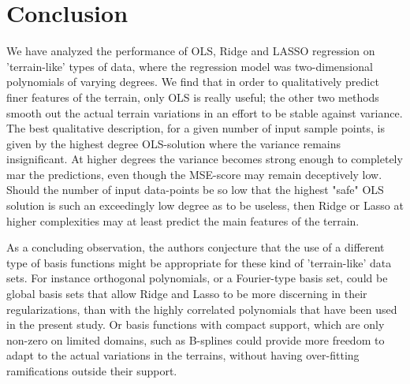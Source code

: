 \documentclass[reprint, english, nofootinbib]{revtex4-2}
\begin{document}

\section{Conclusion}


We have analyzed the performance of OLS, Ridge and LASSO regression on 'terrain-like' types of data, where the regression model was two-dimensional polynomials of varying degrees. We find that in order to qualitatively predict finer features of the terrain, only OLS is really useful; the other two methods smooth out the actual terrain variations in an effort to be stable against variance. The best qualitative description, for a given number of input sample points, is given by the highest degree OLS-solution where the variance remains insignificant. At higher degrees the variance becomes strong enough to completely mar the predictions, even though the MSE-score may remain deceptively low. Should the number of input data-points be so low that the highest "safe" OLS solution is such an exceedingly low degree as to be useless, then Ridge or Lasso at higher complexities may at least predict the main features of the terrain.

As a concluding observation, the authors conjecture that the use of a different type of basis functions might be appropriate for these kind of 'terrain-like' data sets. For instance orthogonal polynomials, or a Fourier-type basis set, could be global basis sets that allow Ridge and Lasso to be more discerning in their regularizations, than with the highly correlated polynomials that have been used in the present study. Or basis functions with compact support, which are only non-zero on limited domains, such as B-splines could provide more freedom to adapt to the actual variations in the terrains, without having over-fitting ramifications outside their support.


\onecolumngrid

\newpage
\twocolumngrid
\appendix
\end{document}
